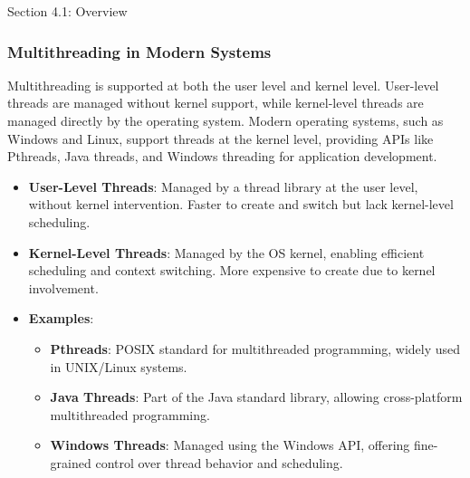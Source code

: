 \begin{notes}{Section 4.1: Overview}
\begin{highlight}
    \end{highlight}
    
    \subsubsection*{Multithreading in Modern Systems}
    
    Multithreading is supported at both the user level and kernel level. User-level threads are managed without kernel support, while kernel-level threads are managed directly by the operating system. 
    Modern operating systems, such as Windows and Linux, support threads at the kernel level, providing APIs like Pthreads, Java threads, and Windows threading for application development.
    
    \begin{highlight}
    
        \begin{itemize}
            \item \textbf{User-Level Threads}: Managed by a thread library at the user level, without kernel intervention. Faster to create and switch but lack kernel-level scheduling.
            \item \textbf{Kernel-Level Threads}: Managed by the OS kernel, enabling efficient scheduling and context switching. More expensive to create due to kernel involvement.
            \item \textbf{Examples}: 
                \begin{itemize}
                    \item \textbf{Pthreads}: POSIX standard for multithreaded programming, widely used in UNIX/Linux systems.
                    \item \textbf{Java Threads}: Part of the Java standard library, allowing cross-platform multithreaded programming.
                    \item \textbf{Windows Threads}: Managed using the Windows API, offering fine-grained control over thread behavior and scheduling.
                \end{itemize}
        \end{itemize}
    
    \end{highlight}
    
    \begin{highlight}
    

\end{highlight}
\end{notes}
